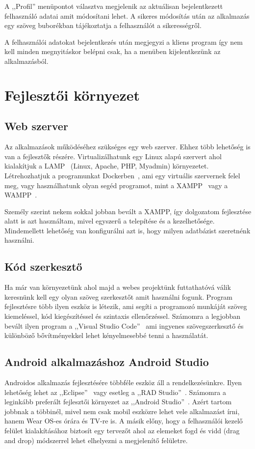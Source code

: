 \documentclass[
]{thesis-ekf}
\theoremstyle{definition}
\theoremstyle{remark}
\begin{document}
	A ,,Profil'' menüpontot választva megjelenik az aktuálisan bejelentkezett felhasználó adatai amit módosítani lehet. A sikeres módosítás után az alkalmazás egy szöveg buborékban tájékoztatja a felhasználót a sikerességről. 
	
	A felhasználói adatokat bejelentkezés után megjegyzi a kliens program így nem kell minden megnyitáskor belépni csak, ha a menüben kijelentkezünk az alkalmazásból. 
	
	\chapter{Fejlesztői környezet}
	\section{Web szerver}
	Az alkalmazások működéséhez szükséges egy web szerver. Ehhez több lehetőség is van a fejlesztők részére. Virtualizálhatunk egy Linux alapú szervert ahol kialakítjuk a LAMP~\cite{lamp_book} (Linux, Apache, PHP, Myadmin) környezetet. Létrehozhatjuk a programunkat Dockerben~\cite{docker_doc}, ami egy virtuális szervernek felel meg, vagy használhatunk olyan segéd programot, mint a XAMPP~\cite{xampp_doc} vagy a WAMPP~\cite{wamp_doc}. 
	
	Személy szerint nekem sokkal jobban bevált a XAMPP, így dolgozatom fejlesztése alatt is azt használtam, mivel egyszerű a telepítése és a kezelhetősége. Mindemellett lehetőség van konfigurálni azt is, hogy milyen adatbázist szeretnénk használni. 
	
	\section{Kód szerkesztő}
	Ha már van környezetünk ahol majd a webes projektünk futtathatóvá válik keresnünk kell egy olyan szöveg szerkesztőt amit használni fogunk. Program fejlesztésre több ilyen eszköz is létezik, ami segíti a programozó munkáját szöveg kiemeléssel, kód kiegészítéssel és szintaxis ellenőrzéssel. Számomra a legjobban bevált ilyen program a ,,Visual Studio Code''~\cite{vsc_doc} ami ingyenes szövegszerkesztő és különböző bővítményekkel lehet kényelmesebbé tenni a használatát.
	
	\section{Android alkalmazáshoz Android Studio}
	Androidos alkalmazás fejlesztésére többféle eszköz áll a rendelkezésünkre. Ilyen lehetőség lehet az ,,Eclipse''~\cite{eclipse_doc} vagy esetleg a ,,RAD Studio''~\cite{rad_doc}. Számomra a leginkább preferált fejlesztői környezet az ,,Android Studio''~\cite{androidStudio_doc}. Azért tartom jobbnak a többinél, mivel nem csak mobil eszközre lehet vele alkalmazást írni, hanem Wear OS-es órára és TV-re is. A másik előny, hogy a felhasználói kezelő felület kialakításához biztosít egy tervezőt ahol az elemeket fogd és vidd (drag and drop) módszerrel lehet elhelyezni a megjelenítő felületre. 
	
\end{document}

